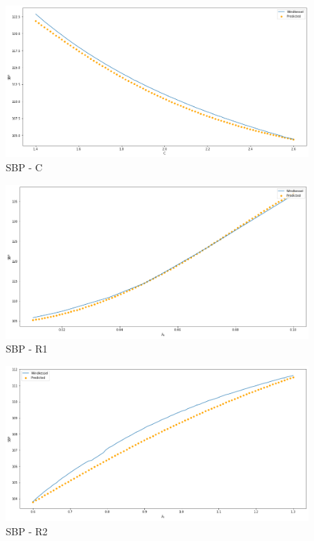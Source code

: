 \newpage

\begin{figure}[h]
    \centering
    \includegraphics[width=1\textwidth]{images/Training - temp/SBP - C.png}
    \caption{SBP - C}
\end{figure}

\newpage

\begin{figure}[h]
    \centering
    \includegraphics[width=1\textwidth]{images/Training - temp/SBP - R1.png}
    \caption{SBP - R1}
\end{figure}


\newpage

\begin{figure}[h]
    \centering
    \includegraphics[width=1\textwidth]{images/Training - temp/SBP - R2.png}
    \caption{SBP - R2}
\end{figure}


